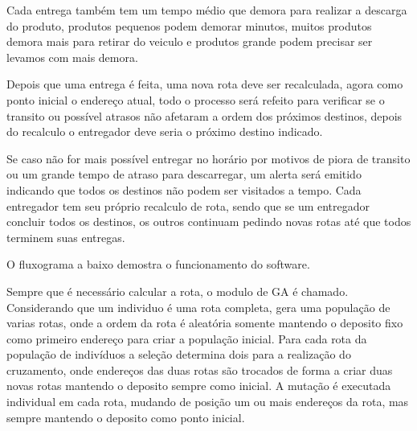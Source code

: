 Cada entrega também tem um tempo médio que demora para realizar a descarga do produto, produtos pequenos podem demorar minutos, muitos produtos demora mais para retirar do veiculo e produtos grande podem precisar ser levamos com mais demora.

Depois que uma entrega é feita, uma nova rota deve ser recalculada, agora como ponto inicial o endereço atual, todo o processo será refeito para verificar se o transito ou possível atrasos não afetaram a ordem dos próximos destinos, depois do recalculo o entregador deve seria o próximo destino indicado.

Se caso não for mais possível entregar no horário por motivos de piora de transito ou um grande tempo de atraso para descarregar, um alerta será emitido indicando que todos os destinos não podem ser visitados a tempo.
Cada entregador tem seu próprio recalculo de rota, sendo que se um entregador concluir todos os destinos, os outros continuam pedindo novas rotas até que todos terminem suas entregas.

O fluxograma a baixo demostra o funcionamento do software.

\begin{center}
    \label{fig:FluxoSoftware}
\end{center}

Sempre que é necessário calcular a rota, o modulo de GA é chamado. Considerando que um individuo é uma rota completa, gera uma população de varias rotas, onde a ordem da rota é aleatória somente mantendo o deposito fixo como primeiro endereço para criar a população inicial.
Para cada rota da população de indivíduos a seleção determina dois para a realização do cruzamento, onde endereços das duas rotas são trocados de forma a criar duas novas rotas mantendo o deposito sempre como inicial. A mutação é executada individual em cada rota, mudando de posição um ou mais endereços da rota, mas sempre 
mantendo o deposito como ponto inicial.

